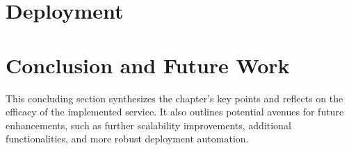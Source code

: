 \section{Deployment}


\section{Conclusion and Future Work}
This concluding section synthesizes the chapter’s key points and reflects on the efficacy of the implemented service. It also outlines potential avenues for future enhancements, such as further scalability improvements, additional functionalities, and more robust deployment automation.





